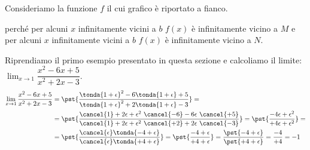 \begin{esempio}
Consideriamo la funzione \(f\) il cui grafico è riportato a fianco.

perché per alcuni \(x\) infinitamente vicini a \(b\) \(f(x)\) è 
infinitamente vicino a \(M\) e per alcuni \(x\) infinitamente vicini a \(b\) 
\(f(x)\) è infinitamente vicino a \(N\).
\end{esempio}

\begin{esempio}
Riprendiamo il primo esempio presentato in questa sezione e calcoliamo il 
limite: \(\displaystyle \lim_{x \to 1}\dfrac{x^2-6x+5}{x^2+2x-3}\).
\begin{align*}
\lim_{x \to 1}\dfrac{x^2-6x+5}{x^2+2x-3} &=
\pst{\dfrac{\tonda{1+\epsilon}^2-6\tonda{1+\epsilon}+5}
           {\tonda{1+\epsilon}^2+2\tonda{1+\epsilon}-3}} = \\
&=\pst{\dfrac{\cancel{1}+2\epsilon+\epsilon^2~
              \cancel{-6}-6\epsilon~\cancel{+5}}
           {\cancel{1}+2\epsilon+\epsilon^2~
            \cancel{+2}+2\epsilon~\cancel{-3}}} =
\pst{\dfrac{-4\epsilon+\epsilon^2}
           {+4\epsilon+\epsilon^2}} = \\
&=\pst{\dfrac{\cancel{\epsilon} \tonda{-4+\epsilon}}
             {\cancel{\epsilon} \tonda{+4+\epsilon}}} =
\pst{\dfrac{-4+\epsilon}{+4+\epsilon}} =
\dfrac{\pst{-4+\epsilon}}{\pst{+4+\epsilon}} =
\dfrac{-4}{+4} = -1
\end{align*}


\end{esempio}



